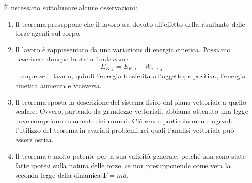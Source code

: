\noindent È necessario sottolineare alcune osservazioni:
\begin{enumerate}
    \item Il teorema presuppone che il lavoro sia dovuto all'effetto della risultante delle forze agenti sul corpo.
    \item Il lavoro è rappresentato da una variazione di energia cinetica. Possiamo descrivere dunque lo stato finale
    come \[ E_{K,f} = E_{K,i} + W_{i\to f} \] dunque se il lavoro, quindi l'energia trasferita all'oggetto, è positivo,
    l'energia cinetica aumenta e viceversa.

    \item Il teorema sposta la descrizione del sistema fisico dal piano vettoriale a quello scalare. Ovvero, partendo
    da grandezze vettoriali, abbiamo ottenuto una legge dove compaiono solamente dei numeri. Ciò rende particolarmente agevole
    l'utilizzo del teorema in svariati problemi nei quali l'analisi vettoriale può essere ostica.

    \item Il teorema è molto potente per la sua validità generale, perché non sono state fatte ipotesi sulla natura delle
    forze, se non presupponendo come vera la seconda legge della dinamica $\textbf{F} = m\textbf{a}$.
\end{enumerate}

